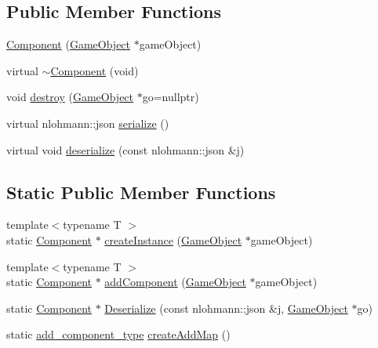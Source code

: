 \subsection*{Public Member Functions}
\begin{DoxyCompactItemize}
\item 
\mbox{\hyperlink{class_beer_engine_1_1_component_1_1_component_ac8c3bb83023f324a8dbf63980a08a5cc}{Component}} (\mbox{\hyperlink{class_beer_engine_1_1_game_object}{Game\+Object}} $\ast$game\+Object)
\item 
virtual \mbox{\hyperlink{class_beer_engine_1_1_component_1_1_component_a1688651a7403f4ff4587185df0b1e8ed}{$\sim$\+Component}} (void)
\item 
void \mbox{\hyperlink{class_beer_engine_1_1_component_1_1_component_a185d4b4ebe7135ce55222b94e3fdd8bf}{destroy}} (\mbox{\hyperlink{class_beer_engine_1_1_game_object}{Game\+Object}} $\ast$go=nullptr)
\item 
virtual nlohmann\+::json \mbox{\hyperlink{class_beer_engine_1_1_component_1_1_component_a4d82d8a6b22b93514e0585fa4073041f}{serialize}} ()
\item 
virtual void \mbox{\hyperlink{class_beer_engine_1_1_component_1_1_component_a044d30f65879a1467f44aa3eb8ad7bce}{deserialize}} (const nlohmann\+::json \&j)
\end{DoxyCompactItemize}
\subsection*{Static Public Member Functions}
\begin{DoxyCompactItemize}
\item 
{\footnotesize template$<$typename T $>$ }\\static \mbox{\hyperlink{class_beer_engine_1_1_component_1_1_component}{Component}} $\ast$ \mbox{\hyperlink{class_beer_engine_1_1_component_1_1_component_ab76c60b461751c67f4110ecb32f94b6b}{create\+Instance}} (\mbox{\hyperlink{class_beer_engine_1_1_game_object}{Game\+Object}} $\ast$game\+Object)
\item 
{\footnotesize template$<$typename T $>$ }\\static \mbox{\hyperlink{class_beer_engine_1_1_component_1_1_component}{Component}} $\ast$ \mbox{\hyperlink{class_beer_engine_1_1_component_1_1_component_aeab2d433593f452807e81d1ada9f4c17}{add\+Component}} (\mbox{\hyperlink{class_beer_engine_1_1_game_object}{Game\+Object}} $\ast$game\+Object)
\item 
static \mbox{\hyperlink{class_beer_engine_1_1_component_1_1_component}{Component}} $\ast$ \mbox{\hyperlink{class_beer_engine_1_1_component_1_1_component_a9d24810dfc25e70d8a1a9d59fdf518a4}{Deserialize}} (const nlohmann\+::json \&j, \mbox{\hyperlink{class_beer_engine_1_1_game_object}{Game\+Object}} $\ast$go)
\item 
static \mbox{\hyperlink{namespace_beer_engine_1_1_component_a58109916ff3e951c90c1dcd5ebba359b}{add\+\_\+component\+\_\+type}} \mbox{\hyperlink{class_beer_engine_1_1_component_1_1_component_a646c01f1d1d951e58431a80f68778b84}{create\+Add\+Map}} ()
\end{DoxyCompactItemize}
